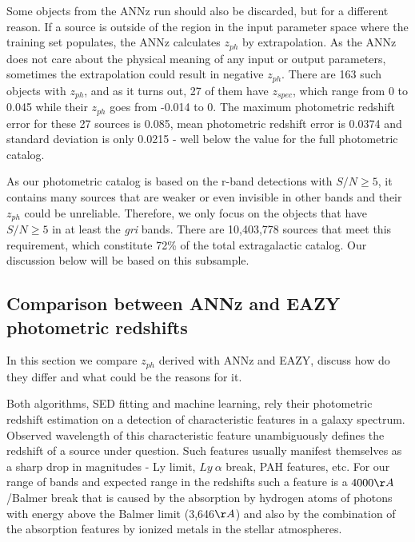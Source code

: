 \documentclass[apj,iop]{emulateapj}
\begin{document}
Some objects from the ANNz run should also be discarded, but for a different reason. If a source is outside of the region in the input parameter space where the training set populates, the ANNz calculates $z_{ph}$ by extrapolation. As the ANNz does not care about the physical meaning of any input or output parameters, sometimes the extrapolation could result in negative $z_{ph}$. There are 163 such objects with $z_{ph}$, and as it turns out, 27 of them have $z_{spec}$, which range from 0 to 0.045 while their $z_{ph}$ goes from -0.014 to 0. The maximum photometric redshift error for these 27 sources is 0.085, mean photometric redshift error is 0.0374 and standard deviation is only 0.0215 - well below the value for the full photometric catalog.


As our photometric catalog is based on the r-band detections with $S/N\geq 5$, it contains many sources that are weaker or even invisible in other bands and their $z_{ph}$ could be unreliable. Therefore, we only focus on the objects that have $S/N\geq 5$ in at least the {\it gri} bands. There are 10,403,778 sources that meet this requirement, which constitute 72\% of the total extragalactic catalog. Our discussion below will be based on this subsample.

\subsection{Comparison between ANNz and EAZY photometric redshifts}

In this section we compare $z_{ph}$ derived with ANNz and EAZY, discuss how do they differ and what could be the reasons for it.

Both algorithms, SED fitting and machine learning, rely their photometric redshift estimation on a detection of characteristic features in a galaxy spectrum. Observed wavelength of this characteristic feature unambiguously defines the redshift of a source under question. Such features usually manifest themselves as a sharp drop in magnitudes - Ly limit, $Ly\ \alpha$ break, PAH features, etc. For our range of bands and expected range in the redshifts such a feature is a $4000\AA$/Balmer break that is caused by the absorption by hydrogen atoms of photons with energy above the Balmer limit (3,646$\AA$) and also by the combination of the absorption features by ionized metals in the stellar atmospheres.
\end{document}
